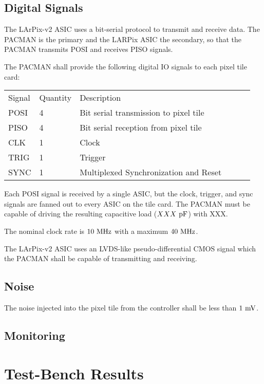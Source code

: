 \documentclass[12pt]{article}
\begin{document}
\subsection{Digital Signals}

The LArPix-v2 ASIC uses a bit-serial protocol to transmit and receive
data.  The PACMAN is the primary and the LARPix ASIC the secondary, so
that the PACMAN transmits POSI and receives PISO signals.

The PACMAN shall provide the following digital IO signals to each
pixel tile card:
\begin{center}
\begin{tabular}{llllll}
Signal & Quantity & Description \\
  POSI & 4 & Bit serial transmission to pixel tile \\
  PISO & 4 & Bit serial reception from pixel tile \\
  CLK  & 1 & Clock \\
  TRIG & 1 & Trigger \\
  SYNC & 1 & Multiplexed Synchronization and Reset \\
\end{tabular}
\end{center}

Each POSI signal is received by a single ASIC, but the clock, trigger,
and sync signals are fanned out to every ASIC on the tile card.  The
PACMAN must be capable of driving the resulting capacitive load
($XXX\rm~pF$) with XXX.

The nominal clock rate is $10~\rm MHz$ with a maximum $40~\rm MHz$.

The LArPix-v2 ASIC uses an LVDS-like pseudo-differential CMOS signal
which the PACMAN shall be capable of transmitting and receiving.

\subsection{Noise}

The noise injected into the pixel tile from the controller shall be
less than $1~\rm mV$.

\subsection{Monitoring}

\section{Test-Bench Results}
\end{document}
